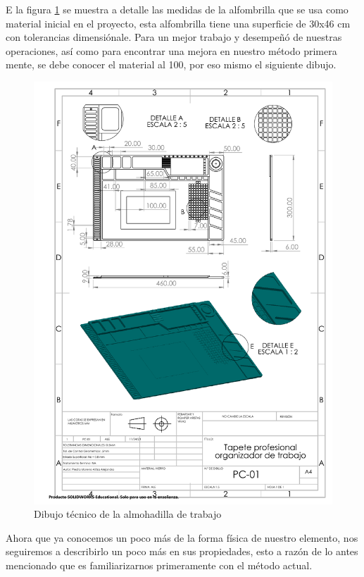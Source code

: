     
    E la figura \ref{fig:almohadillaD} se muestra a detalle las medidas de la alfombrilla que se usa como material inicial en el proyecto, esta alfombrilla tiene una superficie de 30x46 cm con tolerancias dimensiónale. Para un mejor trabajo y desempeñó de nuestras operaciones, así como para encontrar una mejora en nuestro método primera mente, se debe conocer el material al 100, por eso mismo el siguiente dibujo.
    
    \begin{figure}[H]
        \centering
        \includegraphics[trim = {22mm 149mm 20mm 41mm},clip,scale=0.4]{22/Img/almohadillaDibujo.pdf}
        \caption{Dibujo técnico de la almohadilla de trabajo}
        \label{fig:almohadillaD}
    \end{figure}
    
    Ahora que ya conocemos un poco más de la forma física de nuestro elemento, nos seguiremos a describirlo un poco más en sus propiedades, esto a razón de lo antes mencionado que es familiarizarnos primeramente con el método actual.
    
